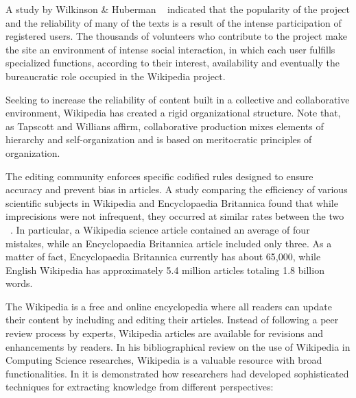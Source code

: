 A study by Wilkinson \& Huberman ~\cite{wilkinson2007assessing} indicated that the popularity of the project and the reliability of many of the texts is a result of the intense participation of registered users.
The thousands of volunteers who contribute to the project make the site an environment of intense social interaction, in which each user fulfills specialized functions, according to their interest, availability and eventually the bureaucratic role occupied in the Wikipedia project. 



Seeking to increase the reliability of content built in a collective and collaborative environment, Wikipedia has created a rigid organizational structure. 
Note that, as Tapscott and Willians \cite{tapscott2008wikinomics} affirm, collaborative production mixes elements of hierarchy and self-organization and is based on meritocratic principles of organization.

The editing community enforces specific codified rules designed to ensure accuracy and prevent bias in articles. A study comparing the efficiency of various scientific subjects in Wikipedia and Encyclopaedia Britannica found that while imprecisions were not infrequent, they occurred at similar rates between the two ~\cite{giles2005internet}. In particular, a Wikipedia science article contained an average of four mistakes, while an Encyclopaedia Britannica article included only three. 
As a matter of fact, Encyclopaedia Britannica currently has about 65,000, while English Wikipedia has approximately 5.4 million articles totaling 1.8 billion words. 



The Wikipedia is a free and online encyclopedia where all readers can update their content by including and editing their articles. Instead of following a peer review process by experts, Wikipedia articles are available for revisions and enhancements by readers. In his bibliographical review on the use of Wikipedia in Computing Science researches,  Wikipedia is a  valuable resource with broad functionalities.  In \cite{medelyan2009mining} it is demonstrated how researchers had developed sophisticated techniques for extracting knowledge from different perspectives:



